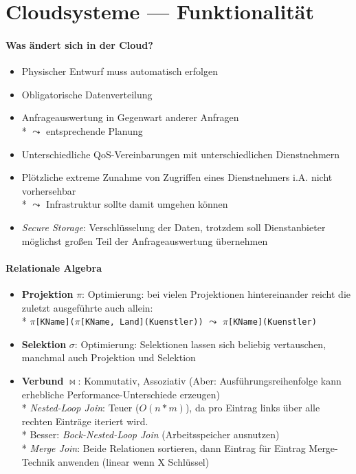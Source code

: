 \section{Cloudsysteme --- Funktionalität}
\label{sec:cloudfunktionalitaet}

\paragraph{Was ändert sich in der Cloud?}
\begin{itemize}
	\item Physischer Entwurf muss automatisch erfolgen
	\item Obligatorische Datenverteilung
	\item Anfrageauswertung in Gegenwart anderer Anfragen
		\\*
		\( \leadsto \) entsprechende Planung
	\item Unterschiedliche QoS-Vereinbarungen mit unterschiedlichen Dienstnehmern
	\item Plötzliche extreme Zunahme von Zugriffen eines Dienstnehmers i.A. nicht vorhersehbar 
		\\*
		\( \leadsto \) Infrastruktur sollte damit umgehen können
	\item \emph{Secure Storage}: Verschlüsselung der Daten, trotzdem soll Dienstanbieter möglichst großen Teil der Anfrageauswertung übernehmen
\end{itemize}

\paragraph{Relationale Algebra}
\begin{itemize}
	\item \textbf{Projektion} $\pi$: Optimierung: bei vielen Projektionen hintereinander reicht die zuletzt ausgeführte auch allein:
		\\*
		\( \pi \)\lstinline{[KName](}\( \pi \)\lstinline{[KName, Land](Kuenstler))} \( \leadsto \) \( \pi \)\lstinline{[KName](Kuenstler)}
	\item \textbf{Selektion} $\sigma$: Optimierung: Selektionen lassen sich beliebig vertauschen, manchmal auch Projektion und Selektion
	\item \textbf{Verbund} $\bowtie$: Kommutativ, Assoziativ (Aber: Ausführungsreihenfolge kann erhebliche Performance-Unterschiede erzeugen)
		\\*
		\emph{Nested-Loop Join}: Teuer ($O(n * m)$), da pro Eintrag links über alle rechten Einträge iteriert wird. \\*
		Besser: \emph{Bock-Nested-Loop Join }(Arbeitsspeicher ausnutzen)
		\\*
		\emph{Merge Join}: Beide Relationen sortieren, dann Eintrag für Eintrag Merge-Technik anwenden (linear wenn X Schlüssel)
\end{itemize}

